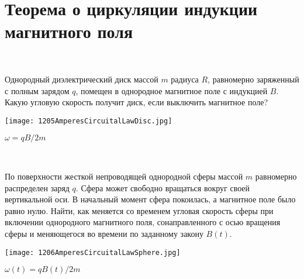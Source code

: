 \section{Теорема о циркуляции индукции магнитного поля}

\begin{ex}
\hspace{0pt} \\
\begin{minipage}{.65\textwidth}
Однородный диэлектрический диск массой $m$ радиуса $R$, равномерно заряженный с полным зарядом $q$, помещен в однородное магнитное поле с индукцией $B$. Какую угловую скорость получит диск, если выключить магнитное поле?
\end{minipage}
\begin{minipage}{.35\textwidth}
\centering
\texttt{[image: 1205AmperesCircuitalLawDisc.jpg]}
\end{minipage}
\begin{ans}
$\omega = qB/2m$
\end{ans}
\end{ex}

\begin{ex}
\hspace{0pt} \\
\begin{minipage}{.65\textwidth}
По поверхности жесткой непроводящей однородной сферы массой $m$ равномерно распределен заряд $q$. 
Сфера может свободно вращаться вокруг своей вертикальной оси. В начальный момент сфера покоилась, а магнитное поле было равно нулю. 
Найти, как меняется со временем угловая скорость сферы при включении однородного магнитного поля, 
сонаправленного с осью вращения сферы и меняющегося во времени по заданному закону $B(t)$.
\end{minipage}
\begin{minipage}{.35\textwidth}
\centering
\texttt{[image: 1206AmperesCircuitalLawSphere.jpg]}
\end{minipage}
\begin{ans}
$\omega(t) = qB(t)/2m$
\end{ans}
\end{ex}